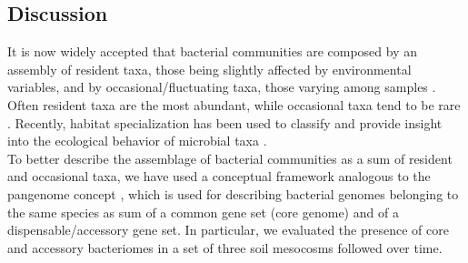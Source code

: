 \subsection{Discussion}
It is now widely accepted that bacterial communities are composed by an assembly of resident taxa, those being slightly affected by environmental variables, and by occasional/fluctuating taxa, those varying among samples \cite{logares2012biogeography}. Often resident taxa are the most abundant, while occasional taxa tend to be rare \cite{gobet2011diversity}. Recently, habitat specialization has been used to classify and provide insight into the ecological behavior of microbial taxa \cite{szekely2014importance}.\\
To better describe the assemblage of bacterial communities as a sum of resident and occasional taxa, we have used a conceptual framework analogous to the pangenome concept \cite{tettelin2008comparative}, which is used for describing bacterial genomes belonging to the same species as sum of a common gene set (core genome) and of a dispensable/accessory gene set. In particular, we evaluated the presence of core and accessory bacteriomes in a set of three soil mesocosms followed over time.\\

